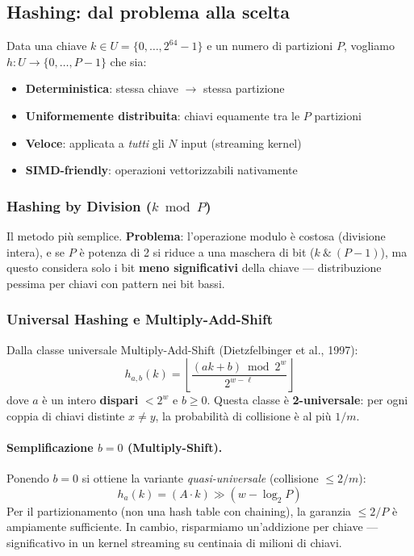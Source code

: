 \documentclass[11pt,a4paper]{article}
\begin{document}
\subsection{Hashing: dal problema alla scelta}

\begin{theorybox}[title=\textbf{Il problema dell'hashing per il partitioning}]
Data una chiave $k \in U = \{0, \ldots, 2^{64}-1\}$ e un numero di partizioni $P$, vogliamo $h: U \to \{0, \ldots, P-1\}$ che sia:
\begin{itemize}
    \item \textbf{Deterministica}: stessa chiave $\to$ stessa partizione
    \item \textbf{Uniformemente distribuita}: chiavi equamente tra le $P$ partizioni
    \item \textbf{Veloce}: applicata a \emph{tutti} gli $N$ input (streaming kernel)
    \item \textbf{SIMD-friendly}: operazioni vettorizzabili nativamente
\end{itemize}
\end{theorybox}

\subsubsection{Hashing by Division ($k \bmod P$)}
Il metodo più semplice. \textbf{Problema}: l'operazione modulo è costosa (divisione intera), e se $P$ è potenza di 2 si riduce a una maschera di bit ($k\ \&\ (P-1)$), ma questo considera solo i bit \textbf{meno significativi} della chiave --- distribuzione pessima per chiavi con pattern nei bit bassi.

\subsubsection{Universal Hashing e Multiply-Add-Shift}
Dalla classe universale Multiply-Add-Shift (Dietzfelbinger et al., 1997):
$$h_{a,b}(k) = \left\lfloor \frac{(ak + b) \bmod 2^w}{2^{w-\ell}} \right\rfloor$$
dove $a$ è un intero \textbf{dispari} $< 2^w$ e $b \geq 0$. Questa classe è \textbf{2-universale}: per ogni coppia di chiavi distinte $x \neq y$, la probabilità di collisione è al più $1/m$.

\paragraph{Semplificazione $b=0$ (Multiply-Shift).}
Ponendo $b = 0$ si ottiene la variante \textit{quasi-universale} (collisione $\leq 2/m$):
$$h_a(k) = (A \cdot k) \gg (w - \log_2 P)$$
Per il partizionamento (non una hash table con chaining), la garanzia $\leq 2/P$ è ampiamente sufficiente. In cambio, risparmiamo un'addizione per chiave --- significativo in un kernel streaming su centinaia di milioni di chiavi.
\end{document}
